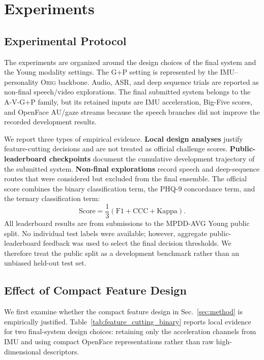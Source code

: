 \documentclass[sigconf,screen,review]{acmart}
\begin{document}
\section{Experiments}
\label{sec:experiments}

\subsection{Experimental Protocol}
\label{sec:exp-protocol}

The experiments are organized around the design choices of the final system and
the Young modality settings. The G+P setting is represented by the
IMU--personality \textsc{Orig} backbone. Audio, ASR, and deep sequence trials
are reported as non-final speech/video explorations. The final submitted system
belongs to the A-V-G+P family, but its retained inputs are IMU acceleration,
Big-Five scores, and OpenFace AU/gaze streams because the speech branches did
not improve the recorded development results.

We report three types of empirical evidence. \textbf{Local design analyses}
justify feature-cutting decisions and are not treated as official challenge
scores. \textbf{Public-leaderboard checkpoints} document the cumulative
development trajectory of the submitted system. \textbf{Non-final explorations}
record speech and deep-sequence routes that were considered but excluded from
the final ensemble. The official score combines the binary classification term,
the PHQ-9 concordance term, and the ternary classification term:
\begin{equation}
\mathrm{Score}
=
\frac{1}{3}
\left(
\mathrm{F1}
+\mathrm{CCC}
+\mathrm{Kappa}
\right).
\label{eq:official-score}
\end{equation}
All leaderboard results are from submissions to the MPDD-AVG Young public split.
No individual test labels were available; however, aggregate public-leaderboard
feedback was used to select the final decision thresholds. We therefore treat
the public split as a development benchmark rather than an unbiased held-out
test set.

\subsection{Effect of Compact Feature Design}
\label{sec:exp-cutting}

We first examine whether the compact feature design in Sec.~\ref{sec:method} is
empirically justified. Table~\ref{tab:feature_cutting_binary} reports local
evidence for two final-system design choices: retaining only the acceleration
channels from IMU and using compact OpenFace representations rather than raw
high-dimensional descriptors.
\end{document}
